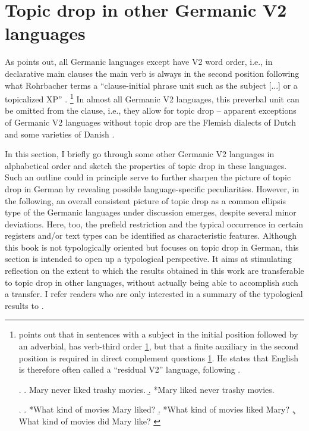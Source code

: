 \section{Topic drop in other Germanic V2 languages}\label{sec:td.germanic}
As \citet[11]{rohrbacher1999} points out, all Germanic languages except  have V2 word order, i.e., in declarative main clauses the main verb is always in the second position following what Rohrbacher terms a ``clause-initial phrase unit such as the subject [...] or a topicalized XP'' \citep[11]{rohrbacher1999}.%
\footnote{\citet[14]{rohrbacher1999} points out that in sentences with a subject in the initial position followed by an adverbial,   has verb-third order \ref{ex:eng.v3}, but that a finite auxiliary  in the second position is required in direct complement questions \ref{ex:eng.q}.
He states that English is therefore often called a ``residual V2'' language, following \citet{rizzi1990a, rizzi1996}.

\ex.\label{ex:eng.v3}
\a. Mary never liked trashy movies. 
\b. *Mary liked never trashy movies. \citep[14]{rohrbacher1999}


\ex.\label{ex:eng.q}
\a. *What kind of movies Mary liked?
\b. *What kind of movies liked Mary?
\c. What kind of movies did Mary like? \citep[14]{rohrbacher1999}

}
In almost all Germanic V2 languages, this preverbal unit can be omitted from the clause, i.e., they allow for topic drop \citep[83]{ackema.neeleman2007} -- apparent exceptions of Germanic V2 languages without topic drop are the Flemish dialects of Dutch \citep[141]{haegeman1996} and some varieties of Danish  \citep[283]{rizzi2000}.

In this section, I briefly go through some other Germanic V2 languages  in alphabetical order and sketch the properties of topic drop in these languages.
Such an outline could in principle serve to further sharpen the picture of topic drop in German by revealing possible language-specific peculiarities.
However, in the following, an overall consistent picture of topic drop as a common ellipsis type of the Germanic languages under discussion emerges, despite several minor deviations.
Here, too, the prefield restriction and the typical occurrence in certain registers and/or text types  can be identified as characteristic features. 
Although this book is not typologically oriented but focuses on topic drop in German, this section is intended to open up a typological perspective.
It aims at stimulating reflection on the extent to which the results obtained in this work are transferable to topic drop in other languages, without actually being able to accomplish such a transfer.
I refer readers who are only interested in a summary of the typological results to .

